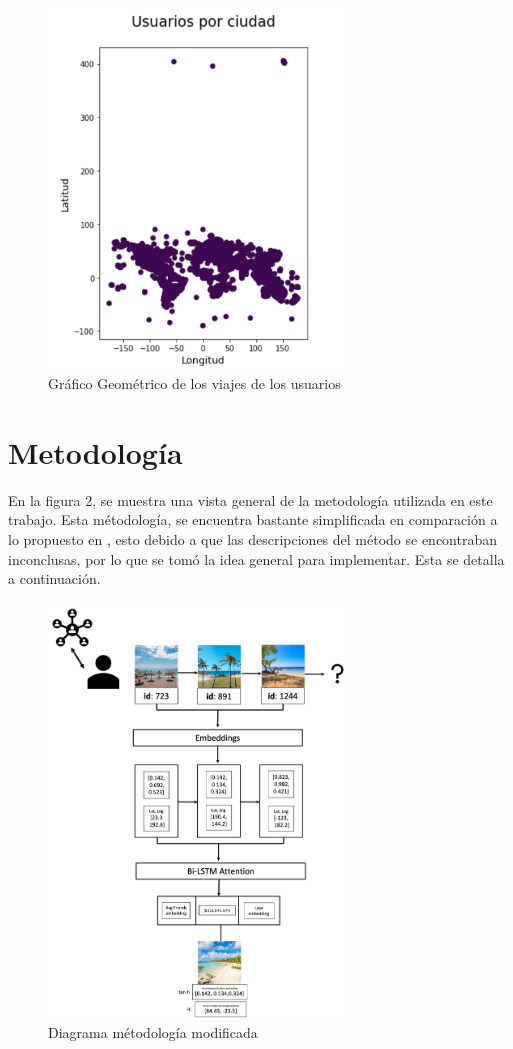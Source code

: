 \documentclass[sigplan,screen]{acmart}
\begin{document}
\begin{figure}[H]
\includegraphics[width=8cm]{dispersion ubivaiones.png}
\centering
\caption{Gráfico Geométrico de los viajes de los usuarios}
\end{figure}


\section{Metodología}

En la figura 2, se muestra una vista general de la metodología utilizada en este trabajo. Esta métodología, se encuentra bastante simplificada en comparación a lo propuesto en \cite{wang2021poi}, esto debido a que las descripciones del método se encontraban inconclusas, por lo que se tomó la idea general para implementar. Esta se detalla a continuación.
\begin{figure}[H]
\includegraphics[width=8cm]{diagrama.png}
\centering
\caption{Diagrama métodología modificada}
\end{figure}
\end{document}
